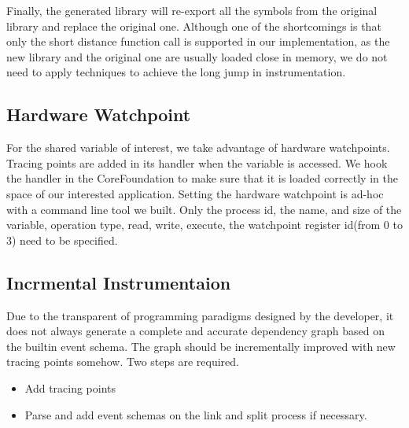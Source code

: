 Finally, the generated library will re-export all the symbols from the original library and replace the original one.
Although one of the shortcomings is that only the short distance function call is supported in our implementation, as the new library and the original one are usually loaded close in memory, we do not need to apply techniques to achieve the long jump in instrumentation.
\subsection{Hardware Watchpoint}
For the shared variable of interest, we take advantage of hardware watchpoints.
Tracing points are added in its handler when the variable is accessed.
We hook the handler in the CoreFoundation to make sure that it is loaded correctly in the space of our interested application.
Setting the hardware watchpoint is ad-hoc with a command line tool we built.
Only the process id, the name, and size of the variable, operation type, read, write, execute, the watchpoint register id(from 0 to 3) need to be specified.

\subsection{Incrmental Instrumentaion}
Due to the transparent of programming paradigms designed by the developer, it does not always generate a complete and accurate dependency graph based on the builtin event schema.
The graph should be incrementally improved with new tracing points somehow.
Two steps are required.
\begin{itemize}
        \item Add tracing points
        \item Parse and add event schemas on the link and split process if necessary.
\end {itemize}


